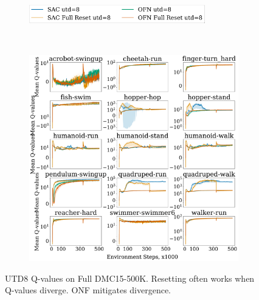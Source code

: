 \begin{figure}[H]
\centering
    \begin{subfigure}[b]{0.8\textwidth}
        \centering
        \includegraphics[height=0.8cm]{figures/dissecting/main_exp/utd_8_Q_legend.pdf}
    \end{subfigure}\\%
    \begin{subfigure}[b]{1\textwidth}
        \centering
        \includegraphics[width=15cm, trim=0cm 0cm 0cm 0cm ,clip]{figures/dissecting/main_exp/utd_8_Q.pdf}
    \end{subfigure}%
    \vspace{-5pt}
    \caption{UTD8 Q-values on Full DMC15-500K. Resetting often works when Q-values diverge. ONF mitigates divergence.}
    \label{fig:utd8_Q}
\end{figure}

\newpage

